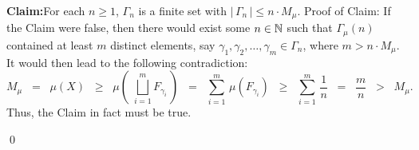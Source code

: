 	\begin{center}
	\begin{minipage}{6.5in}
	\vskip 0.1cm
	\noindent
	\textbf{Claim:}\;\;For each $n \geq 1$, $\Gamma_{n}$ is a finite set with $\left\vert\,\Gamma_{n}\,\right\vert \leq n\cdot M_{\mu}$.
	\vskip 0.2cm
	\noindent
	Proof of Claim:\quad
	If the Claim were false, then there would exist some $n \in \mathbb{N}$ such that $\Gamma_{\mu}(n)$
	contained at least $m$ distinct elements,
	say $\gamma_{1}, \gamma_{2}, \ldots, \gamma_{m} \in \Gamma_{n}$,
	where $m > n\cdot M_{\mu}$.
	It would then lead to the following contradiction:
	\begin{equation*}
	M_{\mu}\;\;=\;\;\mu(X)
	\;\;\geq\;\;\mu\!\left(\;\bigsqcup_{i=1}^{m} F_{\gamma_{i}}\,\right)
	\;\;=\;\; \sum_{i=1}^{m}\,\mu\!\left(F_{\gamma_{i}}\right)
	\;\;\geq\;\; \sum_{i=1}^{m}\,\dfrac{1}{n}
	\;\;=\;\;\dfrac{m}{n}
	\;\;>\;\; M_{\mu}.
	\end{equation*}
	Thus, the Claim in fact must be true.
	\end{minipage}
	\end{center}
\qed


\renewcommand{\theenumi}{\roman{enumi}}
\renewcommand{\labelenumi}{\textnormal{(\theenumi)}$\;\;$}

